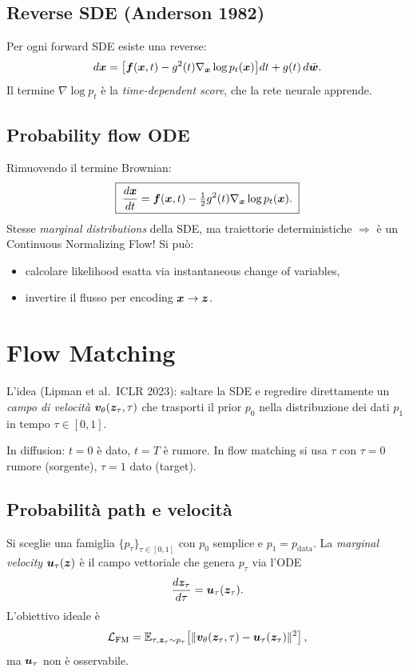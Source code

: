 \subsection{Reverse SDE (Anderson 1982)}
Per ogni forward SDE esiste una reverse:
\begin{equation}\label{eq:reverse-sde}
d\bm{x} = \big[\bm{f}(\bm{x},t) - g^2(t) \nabla_{\bm{x}} \log p_t(\bm{x})\big] dt + g(t)\, d\bar{\bm{w}}.
\end{equation}
Il termine $\nabla \log p_t$ è la \emph{time-dependent score}, che la rete neurale apprende.

\subsection{Probability flow ODE}
Rimuovendo il termine Brownian:
\begin{equation}\label{eq:pfode}
\boxed{\;\frac{d\bm{x}}{dt} = \bm{f}(\bm{x},t) - \tfrac{1}{2}g^2(t)\nabla_{\bm{x}}\log p_t(\bm{x}).\;}
\end{equation}
Stesse \emph{marginal distributions} della SDE, ma traiettorie deterministiche $\Rightarrow$ è un Continuous Normalizing Flow! Si può:
\begin{itemize}
  \item calcolare likelihood esatta via instantaneous change of variables,
  \item invertire il flusso per encoding $\bm{x} \to \bm{z}$.
\end{itemize}

\section{Flow Matching}

L'idea (Lipman et al.\ ICLR 2023): saltare la SDE e regredire direttamente un \emph{campo di velocità} $\bm{v}_\theta(\bm{z}_\tau, \tau)$ che trasporti il prior $p_0$ nella distribuzione dei dati $p_1$ in tempo $\tau \in [0,1]$.

\begin{remark}
In diffusion: $t=0$ è dato, $t=T$ è rumore. In flow matching si usa $\tau$ con $\tau=0$ rumore (sorgente), $\tau=1$ dato (target).
\end{remark}

\subsection{Probabilità path e velocità}
Si sceglie una famiglia $\{p_\tau\}_{\tau\in[0,1]}$ con $p_0$ semplice e $p_1 = p_{\text{data}}$. La \emph{marginal velocity} $\bm{u}_\tau(\bm{z})$ è il campo vettoriale che genera $p_\tau$ via l'ODE
\[
\frac{d\bm{z}_\tau}{d\tau} = \bm{u}_\tau(\bm{z}_\tau).
\]
L'obiettivo ideale è
\[
\mathcal{L}_{\text{FM}} = \mathbb{E}_{\tau, \bm{z}_\tau \sim p_\tau}\!\left[ \|\bm{v}_\theta(\bm{z}_\tau, \tau) - \bm{u}_\tau(\bm{z}_\tau)\|^2\right],
\]
ma $\bm{u}_\tau$ non è osservabile.

